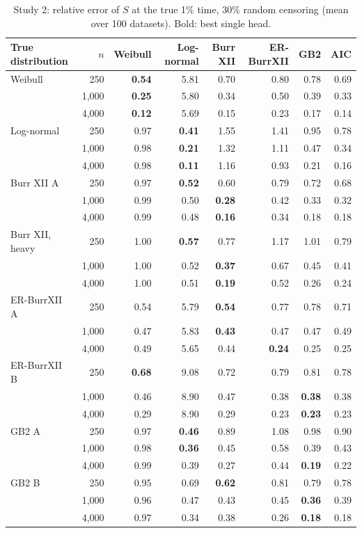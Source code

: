 \begin{table}[htbp]
\centering
\caption{Study 2: relative error of $S$ at the true 1\% time, 30\% random censoring (mean over 100 datasets). Bold: best single head.}\label{stab:misspec_tail_random30}
\small
\begin{tabular}{lrrrrrrr}
\toprule
True distribution & $n$ & Weibull & Log-normal & Burr XII & ER-BurrXII & GB2 & AIC \\
\midrule
Weibull & 250 & \textbf{0.54} & 5.81 & 0.70 & 0.80 & 0.78 & 0.69 \\
 & 1,000 & \textbf{0.25} & 5.80 & 0.34 & 0.50 & 0.39 & 0.33 \\
 & 4,000 & \textbf{0.12} & 5.69 & 0.15 & 0.23 & 0.17 & 0.14 \\
Log-normal & 250 & 0.97 & \textbf{0.41} & 1.55 & 1.41 & 0.95 & 0.78 \\
 & 1,000 & 0.98 & \textbf{0.21} & 1.32 & 1.11 & 0.47 & 0.34 \\
 & 4,000 & 0.98 & \textbf{0.11} & 1.16 & 0.93 & 0.21 & 0.16 \\
Burr XII A & 250 & 0.97 & \textbf{0.52} & 0.60 & 0.79 & 0.72 & 0.68 \\
 & 1,000 & 0.99 & 0.50 & \textbf{0.28} & 0.42 & 0.33 & 0.32 \\
 & 4,000 & 0.99 & 0.48 & \textbf{0.16} & 0.34 & 0.18 & 0.18 \\
Burr XII, heavy & 250 & 1.00 & \textbf{0.57} & 0.77 & 1.17 & 1.01 & 0.79 \\
 & 1,000 & 1.00 & 0.52 & \textbf{0.37} & 0.67 & 0.45 & 0.41 \\
 & 4,000 & 1.00 & 0.51 & \textbf{0.19} & 0.52 & 0.26 & 0.24 \\
ER-BurrXII A & 250 & 0.54 & 5.79 & \textbf{0.54} & 0.77 & 0.78 & 0.71 \\
 & 1,000 & 0.47 & 5.83 & \textbf{0.43} & 0.47 & 0.47 & 0.49 \\
 & 4,000 & 0.49 & 5.65 & 0.44 & \textbf{0.24} & 0.25 & 0.25 \\
ER-BurrXII B & 250 & \textbf{0.68} & 9.08 & 0.72 & 0.79 & 0.81 & 0.78 \\
 & 1,000 & 0.46 & 8.90 & 0.47 & 0.38 & \textbf{0.38} & 0.38 \\
 & 4,000 & 0.29 & 8.90 & 0.29 & 0.23 & \textbf{0.23} & 0.23 \\
GB2 A & 250 & 0.97 & \textbf{0.46} & 0.89 & 1.08 & 0.98 & 0.90 \\
 & 1,000 & 0.98 & \textbf{0.36} & 0.45 & 0.58 & 0.39 & 0.43 \\
 & 4,000 & 0.99 & 0.39 & 0.27 & 0.44 & \textbf{0.19} & 0.22 \\
GB2 B & 250 & 0.95 & 0.69 & \textbf{0.62} & 0.81 & 0.79 & 0.78 \\
 & 1,000 & 0.96 & 0.47 & 0.43 & 0.45 & \textbf{0.36} & 0.39 \\
 & 4,000 & 0.97 & 0.34 & 0.38 & 0.26 & \textbf{0.18} & 0.18 \\
\bottomrule
\end{tabular}
\end{table}
